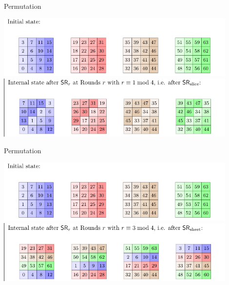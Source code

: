 \begin{frame}{Permutation}
        \begin{center}
\includegraphics[width=0.9\textwidth,height=0.9\textheight,keepaspectratio]{Images/Figures/p1.png}
\includegraphics[width=0.9\textwidth,height=0.9\textheight,keepaspectratio]{Images/Figures/p2.png}
\end{center}
\end{frame}

\begin{frame}{Permutation}
        \begin{center}
\includegraphics[width=0.9\textwidth,height=0.9\textheight,keepaspectratio]{Images/Figures/p1.png}
\includegraphics[width=0.9\textwidth,height=0.9\textheight,keepaspectratio]{Images/Figures/p3.png}
\end{center}
\end{frame}

